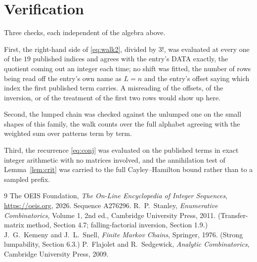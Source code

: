 \documentclass[11pt,a4paper]{article}
\theoremstyle{plain}
\theoremstyle{definition}
\begin{document}
\section{Verification}

Three checks, each independent of the algebra above.

First, the right-hand side of \eqref{eq:walk2}, divided by $3!$, was evaluated at every
one of the $19$ published indices and agrees with the entry's DATA exactly, the quotient
coming out an integer each time; no shift was fitted, the number of rows being read off the
entry's own name as $L=n$ and the entry's offset saying which index the first published
term carries. A misreading of the offsets, of the inversion, or of the treatment of the first
two rows would show up here.

Second, the lumped chain was checked against the unlumped one on the small shapes of this
family, the walk counts over the full alphabet agreeing with the weighted sum over patterns
term by term.

Third, the recurrence \eqref{eq:conj} was evaluated on the published terms in exact integer
arithmetic with no matrices involved, and the annihilation test of Lemma~\ref{lem:crit} was
carried to the full Cayley--Hamilton bound rather than to a sampled prefix.

\begin{thebibliography}{9}
 The OEIS Foundation, \emph{The On-Line Encyclopedia of Integer
Sequences}, \url{https://oeis.org}, 2026. Sequence A276296.
 R.~P.~Stanley, \emph{Enumerative Combinatorics}, Volume 1, 2nd ed.,
Cambridge University Press, 2011. (Transfer-matrix method, Section 4.7; falling-factorial
inversion, Section 1.9.)
 J.~G.~Kemeny and J.~L.~Snell, \emph{Finite Markov Chains}, Springer,
1976. (Strong lumpability, Section 6.3.)
 P.~Flajolet and R.~Sedgewick, \emph{Analytic Combinatorics}, Cambridge
University Press, 2009.
\end{thebibliography}
\end{document}
